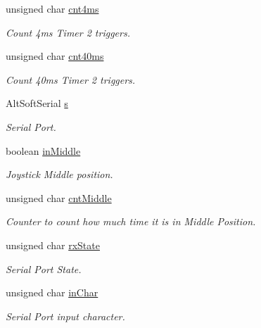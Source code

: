 \begin{DoxyCompactItemize}
unsigned char \mbox{\hyperlink{slave_8ino_ac5d1ffdf8d27a1d426758f404490cf9f}{cnt4ms}}
\begin{DoxyCompactList}\small\item\em Count 4ms Timer 2 triggers. \end{DoxyCompactList}\item 
\mbox{\label{slave_8ino_ae5706ef178bfd4a28331580ac6775816}} 
unsigned char \mbox{\hyperlink{slave_8ino_ae5706ef178bfd4a28331580ac6775816}{cnt40ms}}
\begin{DoxyCompactList}\small\item\em Count 40ms Timer 2 triggers. \end{DoxyCompactList}\item 
\mbox{\label{slave_8ino_a104b9456ac0168a4fc542c36d0d6e5c0}} 
Alt\+Soft\+Serial \mbox{\hyperlink{slave_8ino_a104b9456ac0168a4fc542c36d0d6e5c0}{s}}
\begin{DoxyCompactList}\small\item\em Serial Port. \end{DoxyCompactList}\item 
\mbox{\label{slave_8ino_a14307e34d72446f8de465828c44258c0}} 
boolean \mbox{\hyperlink{slave_8ino_a14307e34d72446f8de465828c44258c0}{in\+Middle}}
\begin{DoxyCompactList}\small\item\em Joystick Middle position. \end{DoxyCompactList}\item 
\mbox{\label{slave_8ino_a74b7512e5d4ca1d133f9179dc3a52474}} 
unsigned char \mbox{\hyperlink{slave_8ino_a74b7512e5d4ca1d133f9179dc3a52474}{cnt\+Middle}}
\begin{DoxyCompactList}\small\item\em Counter to count how much time it is in Middle Position. \end{DoxyCompactList}\item 
\mbox{\label{slave_8ino_a1384985077089723c6b018e994fbfb24}} 
unsigned char \mbox{\hyperlink{slave_8ino_a1384985077089723c6b018e994fbfb24}{rx\+State}}
\begin{DoxyCompactList}\small\item\em Serial Port State. \end{DoxyCompactList}\item 
\mbox{\label{slave_8ino_a4d87cdc7ca3ca36af5abb2b043f14ade}} 
unsigned char \mbox{\hyperlink{slave_8ino_a4d87cdc7ca3ca36af5abb2b043f14ade}{in\+Char}}
\begin{DoxyCompactList}\small\item\em Serial Port input character. \end{DoxyCompactList}\end{DoxyCompactItemize}


